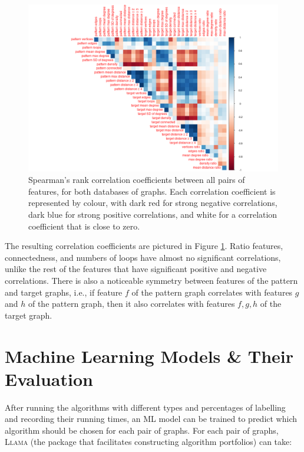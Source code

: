 \documentclass{l4proj}
\theoremstyle{definition}
\theoremstyle{remark}
\begin{document}
\begin{figure}
  \centering
  \includegraphics[width=\textwidth]{images/feature_correlations.png}
  \caption{Spearman's rank correlation coefficients between all pairs of
    features, for both databases of graphs. Each correlation coefficient is
    represented by colour, with dark red for strong negative correlations,
    dark blue for strong positive correlations, and white for a correlation
    coefficient that is close to zero.}
  \label{fig:feature_correlations}
\end{figure}

The resulting correlation coefficients are pictured in Figure
\ref{fig:feature_correlations}. Ratio features, connectedness, and numbers of
loops have almost no significant correlations, unlike the rest of the features
that have significant positive and negative correlations. There is also a
noticeable symmetry between features of the pattern and target graphs, i.e., if
feature $f$ of the pattern graph correlates with features $g$ and $h$ of the
pattern graph, then it also correlates with features $f, g, h$ of the target
graph.

\chapter{Machine Learning Models \& Their Evaluation} \label{chapter:ml}

After running the algorithms  with different types and percentages of labelling
and recording their running times, an ML model can be trained to predict which
algorithm should be chosen for each pair of graphs. For each pair of graphs,
\textsc{Llama} \cite{llama} (the package that facilitates constructing algorithm
portfolios) can take:
\end{document}
